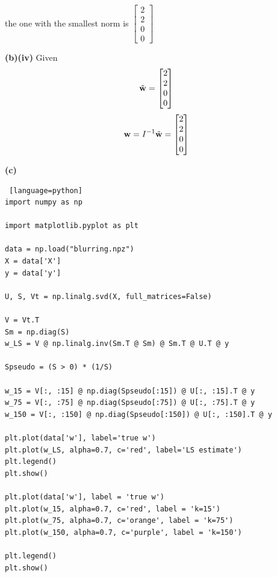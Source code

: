 \documentclass[a4paper, 12pt]{article}
\begin{document}
\begin{solution}
    the one with the smallest norm is $\begin{bmatrix}
            2 \\2 \\ 0 \\0
        \end{bmatrix}$

    \textbf{(b)(iv)} Given \[
    \tilde{\mathbf{w}} = \begin{bmatrix}
    2 \\2 \\
    0\\
    0
    \end{bmatrix}
    \]
    \[
    \mathbf{w} = I^{-1}\tilde{\mathbf{w}} = \begin{bmatrix}
        2 \\2 \\ 0 \\0
    \end{bmatrix}
    \]

    \textbf{(c)}
\begin{lstlisting} [language=python]
import numpy as np

import matplotlib.pyplot as plt

data = np.load("blurring.npz")
X = data['X']
y = data['y']

U, S, Vt = np.linalg.svd(X, full_matrices=False)

V = Vt.T
Sm = np.diag(S)
w_LS = V @ np.linalg.inv(Sm.T @ Sm) @ Sm.T @ U.T @ y

Spseudo = (S > 0) * (1/S)

w_15 = V[:, :15] @ np.diag(Spseudo[:15]) @ U[:, :15].T @ y
w_75 = V[:, :75] @ np.diag(Spseudo[:75]) @ U[:, :75].T @ y
w_150 = V[:, :150] @ np.diag(Spseudo[:150]) @ U[:, :150].T @ y

plt.plot(data['w'], label='true w')
plt.plot(w_LS, alpha=0.7, c='red', label='LS estimate')
plt.legend()
plt.show()

plt.plot(data['w'], label = 'true w')
plt.plot(w_15, alpha=0.7, c='red', label = 'k=15')
plt.plot(w_75, alpha=0.7, c='orange', label = 'k=75')
plt.plot(w_150, alpha=0.7, c='purple', label = 'k=150')

plt.legend()
plt.show()


\end{lstlisting}
\end{solution}
\end{document}
